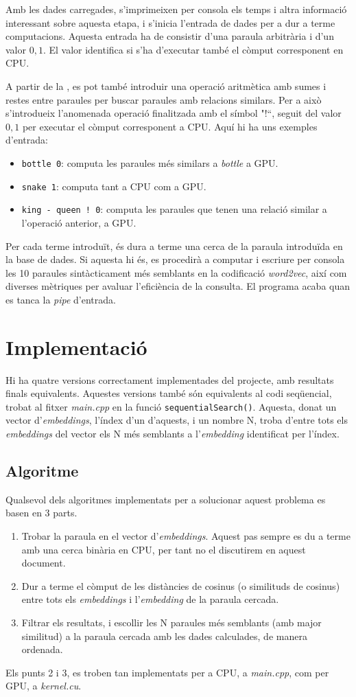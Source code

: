 \documentclass[catalan,10pt,a4paper]{article}
\begin{document}
Amb les dades carregades, s'imprimeixen per consola els temps i altra informació interessant sobre aquesta etapa, i s'inicia l'entrada de dades per a dur a terme computacions. \newline
Aquesta entrada ha de consistir d'una paraula arbitrària i d'un valor ${0,1}$. El valor identifica si s'ha d'executar també el còmput corresponent en CPU.

A partir de la , es pot també introduir una operació aritmètica amb sumes i restes entre paraules per buscar paraules amb relacions similars. Per a això s'introdueix l'anomenada operació finalitzada amb el símbol "!``, seguit del valor ${0,1}$ per executar el còmput corresponent a CPU.
Aquí hi ha uns exemples d'entrada:
\begin{itemize}
	\item \verb|bottle 0|: computa les paraules més similars a \textit{bottle} a GPU.
	\item \verb|snake 1|: computa tant a CPU com a GPU.
	\item \verb|king - queen ! 0|: computa les paraules que tenen una relació similar a l'operació anterior, a GPU.
\end{itemize}
Per cada terme introduït, és dura a terme una cerca de la paraula introduïda en la base de dades. Si aquesta hi és, es procedirà a computar i escriure per consola les 10 paraules sintàcticament més semblants en la codificació \textit{word2vec}, així com diverses mètriques per avaluar l'eficiència de la consulta.
El programa acaba quan es tanca la \textit{pipe} d'entrada.
\section*{Implementació}
Hi ha quatre versions correctament implementades del projecte, amb resultats finals equivalents.
Aquestes versions també són equivalents al codi seqüencial, trobat al fitxer \textit{main.cpp} en la funció \verb|sequentialSearch()|. Aquesta, donat un vector d'\textit{embeddings}, l'índex d'un d'aquests, i un nombre N, troba d'entre tots els \textit{embeddings} del vector els N més semblants a l'\textit{embedding} identificat per l'índex.
\subsection*{Algoritme}
Qualsevol dels algoritmes implementats per a solucionar aquest problema es basen en 3 parts.
\begin{enumerate}
	\item Trobar la paraula en el vector d'\textit{embeddings}. Aquest pas sempre es du a terme amb una cerca binària en CPU, per tant no el discutirem en aquest document.
	\item Dur a terme el còmput de les distàncies de cosinus (o similituds de cosinus) entre tots els \textit{embeddings} i l'\textit{embedding} de la paraula cercada.
	\item Filtrar els resultats, i escollir les N paraules més semblants (amb major similitud) a la paraula cercada amb les dades calculades, de manera ordenada.
\end{enumerate}
Els punts 2 i 3, es troben tan implementats per a CPU, a \textit{main.cpp}, com per GPU, a \textit{kernel.cu}.
\end{document}
